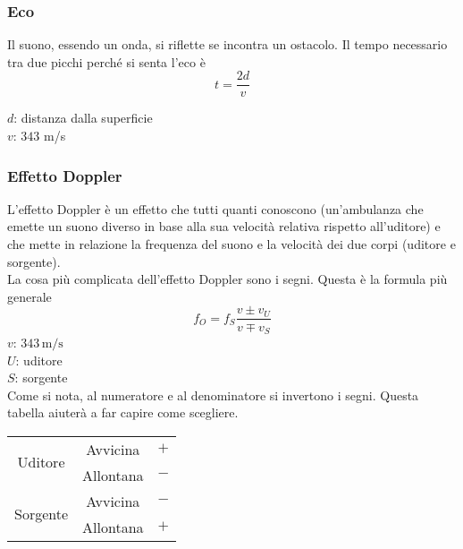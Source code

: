 \subsubsection{Eco}
Il suono, essendo un onda, si riflette se incontra un ostacolo. Il tempo necessario tra due picchi
perché si senta l'eco è
\begin{equation*}
  t = \frac{2d}{v}
\end{equation*}
\begin{center}
\end{center}
$d$: distanza dalla superficie\\
\hyperref[tab:vs]{$v$}: $343$ m/s

\subsubsection{Effetto Doppler}
L'effetto Doppler è un effetto che tutti quanti conoscono (un'ambulanza che emette un 
suono diverso in base alla sua velocità relativa rispetto all'uditore) e che mette in relazione la 
frequenza del suono e la velocità dei due corpi (uditore e sorgente).\\

La cosa più complicata dell'effetto Doppler sono i segni. Questa è la formula più generale
\begin{equation*}
  f_O = f_S\frac{v\pm v_U}{v\mp v_S}
\end{equation*}
\hyperref[tab:vs]{$v$}: $343\,\text{m/s}$\\
$U$: uditore\\
$S$: sorgente\\

Come si nota, al numeratore e al denominatore si invertono i segni. Questa tabella aiuterà a far 
capire come scegliere.

\begin{center}
  \begin{tabular}{| c | c | c |}
    \hline
    \multicolumn{1}{|c}{\multirow{2}{*}{Uditore}} & 
    \multicolumn{1}{|c|}{Avvicina} & $+$\\ \cline{2-3}
    \multicolumn{1}{|c}{} &
    \multicolumn{1}{|c|}{Allontana} & $-$\\ 
    \hline\hline
    \multicolumn{1}{|c}{\multirow{2}{*}{Sorgente}} & 
    \multicolumn{1}{|c|}{Avvicina} & $-$\\ \cline{2-3}
    \multicolumn{1}{|c}{} &
    \multicolumn{1}{|c|}{Allontana} & $+$\\
    \hline 
  \end{tabular}
\end{center}

